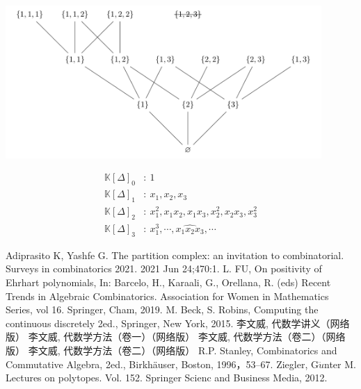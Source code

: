 \documentclass[12pt,a4paper]{ctexbook} %
\numberwithin{figure}{section}
\theoremstyle{problemstyle}
\numberwithin{equation}{section} %
\begin{document}
	
\noindent
	\begin{minipage}[b]{0.6\linewidth}
		\centering
		\includegraphics[width=0.9\textwidth]{pic6}
	\end{minipage}
	\hfill
\begin{minipage}[b]{0.4\linewidth}
	\begin{align*}
		\mathbb{K}[\Delta]_0&:\ 1\\
		\mathbb{K}[\Delta]_1&:\ x_1,x_2,x_3\\
		\mathbb{K}[\Delta]_2&:\ x_1^2,x_1x_2,x_1x_3,x_2^2,x_2x_3,x_3^2\\
		\mathbb{K}[\Delta]_3&:\ x_1^3,\cdots,\widehat{x_1x_2x_3},\cdots
	\end{align*}
\end{minipage}





\begin{thebibliography}{99}
 Adiprasito K, Yashfe G. The partition complex: an invitation to combinatorial. Surveys in combinatorics 2021. 2021 Jun 24;470:1.
 L. FU, On positivity of Ehrhart polynomials,  In: Barcelo, H., Karaali, G., Orellana, R. (eds) Recent Trends in Algebraic Combinatorics. Association for Women in Mathematics Series, vol 16. Springer, Cham, 2019.
 M. Beck, S. Robins, Computing the continuous discretely 2ed., Springer, New York, 2015.
 李文威, 代数学讲义（网络版）
 李文威, 代数学方法（卷一）（网络版）
 李文威, 代数学方法（卷二）（网络版）
 李文威, 代数学方法（卷二）（网络版）
R.P. Stanley, Combinatorics and Commutative Algebra,
2ed., Birkh\"auser,  Boston, 1996，53--67.
Ziegler, G$\ddot{u}$nter M. Lectures on polytopes. Vol. 152. Springer Scienc and Business Media, 2012.

\end{thebibliography}

\end{document}
